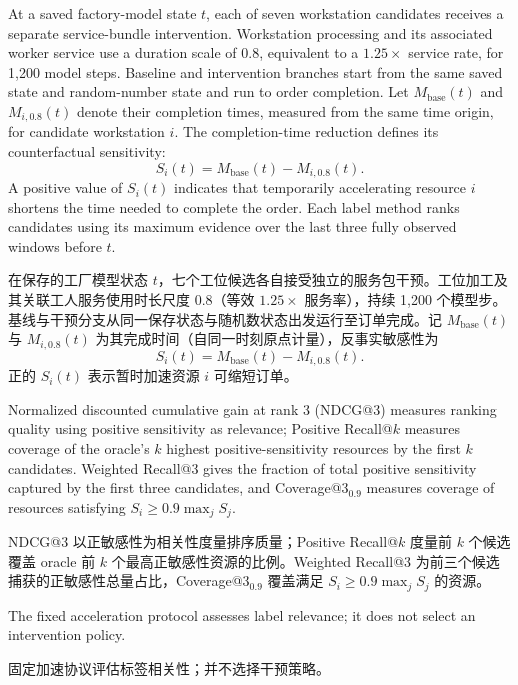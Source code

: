 \documentclass[a4paper,fleqn]{cas-dc}
\newcommand{\zhpara}[1]{%
  \par\begingroup\small\color{black!72}\noindent #1\par\endgroup}
\begin{document}
At a saved factory-model state $t$, each of seven workstation candidates receives a separate service-bundle intervention. Workstation processing and its associated worker service use a duration scale of $0.8$, equivalent to a $1.25\times$ service rate, for 1,200 model steps. Baseline and intervention branches start from the same saved state and random-number state and run to order completion. Let $M_{\mathrm{base}}(t)$ and $M_{i,0.8}(t)$ denote their completion times, measured from the same time origin, for candidate workstation $i$. The completion-time reduction defines its counterfactual sensitivity:
\begin{equation}
S_i(t)=M_{\mathrm{base}}(t)-M_{i,0.8}(t).
\end{equation}
A positive value of $S_i(t)$ indicates that temporarily accelerating resource $i$ shortens the time needed to complete the order. Each label method ranks candidates using its maximum evidence over the last three fully observed windows before $t$.

\zhpara{在保存的工厂模型状态 $t$，七个工位候选各自接受独立的服务包干预。工位加工及其关联工人服务使用时长尺度 $0.8$（等效 $1.25\times$ 服务率），持续 1{,}200 个模型步。基线与干预分支从同一保存状态与随机数状态出发运行至订单完成。记 $M_{\mathrm{base}}(t)$ 与 $M_{i,0.8}(t)$ 为其完成时间（自同一时刻原点计量），反事实敏感性为
\begin{equation}
S_i(t)=M_{\mathrm{base}}(t)-M_{i,0.8}(t).
\end{equation}
正的 $S_i(t)$ 表示暂时加速资源 $i$ 可缩短订单。}


Normalized discounted cumulative gain at rank 3 (NDCG@3) measures ranking quality using positive sensitivity as relevance; Positive Recall@$k$ measures coverage of the oracle's $k$ highest positive-sensitivity resources by the first $k$ candidates. Weighted Recall@3 gives the fraction of total positive sensitivity captured by the first three candidates, and Coverage@3$_{0.9}$ measures coverage of resources satisfying $S_i\geq0.9\max_j S_j$.

\zhpara{NDCG@3 以正敏感性为相关性度量排序质量；Positive Recall@$k$ 度量前 $k$ 个候选覆盖 oracle 前 $k$ 个最高正敏感性资源的比例。Weighted Recall@3 为前三个候选捕获的正敏感性总量占比，Coverage@3$_{0.9}$ 覆盖满足 $S_i\geq0.9\max_j S_j$ 的资源。}


The fixed acceleration protocol assesses label relevance; it does not select an intervention policy.

\zhpara{固定加速协议评估标签相关性；并不选择干预策略。}
\end{document}
